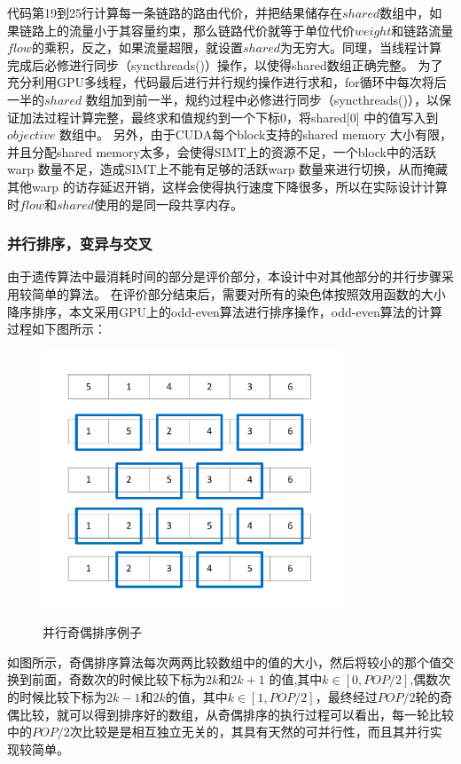   代码第19到25行计算每一条链路的路由代价，并把结果储存在$shared$数组中，如果链路上的流量小于其容量约束，那么链路代价就等于单位代价$weight$和链路流量$flow$的乘积，反之，如果流量超限，就设置$shared$为无穷大。同理，当线程计算完成后必修进行同步（syncthreads()）操作，以使得shared数组正确完整。	
  为了充分利用GPU多线程，代码最后进行并行规约操作进行求和，for循环中每次将后一半的$shared$ 数组加到前一半，规约过程中必修进行同步（syncthreads()），以保证加法过程计算完整，最终求和值规约到一个下标0，将shared[0] 中的值写入到$objective$ 数组中。
  另外，由于CUDA每个block支持的shared memory 大小有限，并且分配shared memory太多，会使得SIMT上的资源不足，一个block中的活跃warp 数量不足，造成SIMT上不能有足够的活跃warp 数量来进行切换，从而掩藏其他warp 的访存延迟开销，这样会使得执行速度下降很多，所以在实际设计计算时$flow$和$shared$使用的是同一段共享内存。
\subsubsection{并行排序，变异与交叉}
  由于遗传算法中最消耗时间的部分是评价部分，本设计中对其他部分的并行步骤采用较简单的算法。
  在评价部分结束后，需要对所有的染色体按照效用函数的大小降序排序，本文采用GPU上的odd-even算法进行排序操作，odd-even算法的计算过程如下图所示：
\begin{figure}
  \begin{center}
    {\includegraphics[width=0.8\textwidth]{figures/odd-even.pdf}}
    \end{center}
  \caption{{\footnotesize{并行奇偶排序例子}}}
  \label{IterNum}
\end{figure}
  如图所示，奇偶排序算法每次两两比较数组中的值的大小，然后将较小的那个值交换到前面，奇数次的时候比较下标为$2k 和2k+1$ 的值,其中$k \in [0,POP/2]$,偶数次的时候比较下标为$2k-1和2k$的值，其中$k \in[1,POP/2]$，最终经过$POP/2$轮的奇偶比较，就可以得到排序好的数组，从奇偶排序的执行过程可以看出，每一轮比较中的$POP/2$次比较是是相互独立无关的，其具有天然的可并行性，而且其并行实现较简单。
